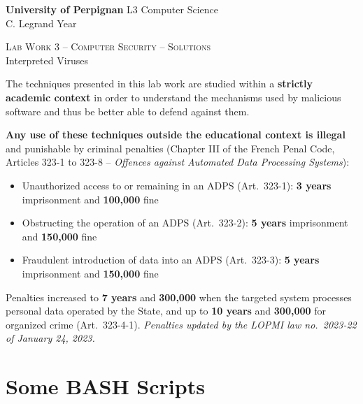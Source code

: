 \documentclass[a4paper,11pt]{article}
\theoremstyle{plain}
\theoremstyle{definition}
\begin{document}
\hbox{}
\noindent \textbf{University of Perpignan} \hfill  L3 Computer Science \\
 \hfill C. Legrand \hfill  Year \the\year  \\
\smallskip
\begin{center}
{
 {\scshape \large Lab Work 3 -- Computer Security -- Solutions}  \\
 Interpreted Viruses
}
\end{center}
\hbox{}

\bigskip

\begin{ethique}
The techniques presented in this lab work are studied within a \textbf{strictly academic context} in order to understand the mechanisms used by malicious software and thus be better able to defend against them.

\textbf{Any use of these techniques outside the educational context is illegal} and punishable by criminal penalties (Chapter III of the French Penal Code, Articles 323-1 to 323-8 -- \textit{Offences against Automated Data Processing Systems}):
\begin{itemize}
    \item Unauthorized access to or remaining in an ADPS (Art.~323-1): \textbf{3 years} imprisonment and \textbf{\texteuro{}100,000} fine
    \item Obstructing the operation of an ADPS (Art.~323-2): \textbf{5 years} imprisonment and \textbf{\texteuro{}150,000} fine
    \item Fraudulent introduction of data into an ADPS (Art.~323-3): \textbf{5 years} imprisonment and \textbf{\texteuro{}150,000} fine
\end{itemize}
Penalties increased to \textbf{7 years} and \textbf{\texteuro{}300,000} when the targeted system processes personal data operated by the State, and up to \textbf{10 years} and \textbf{\texteuro{}300,000} for organized crime (Art.~323-4-1). \textit{Penalties updated by the LOPMI law no.~2023-22 of January 24, 2023.}
\end{ethique}

\bigskip


\section{Some BASH Scripts}
\end{document}
